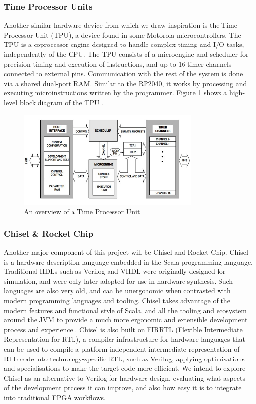 \documentclass[a4paper,fleqn,12pt]{article}
\begin{document}
\subsubsection{Time Processor Units}

Another similar hardware device from which we draw inspiration is the Time Processor Unit (TPU), a device found in some Motorola microcontrollers. The TPU is a coprocessor engine designed to handle complex timing and I/O tasks, independently of the CPU. The TPU consists of a microengine and scheduler for precision timing and execution of instructions, and up to 16 timer channels connected to external pins. Communication with the rest of the system is done via a shared dual-port RAM. Similar to the RP2040, it works by processing and executing microinstructions written by the programmer. Figure \ref{fig:tpu} shows a high-level block diagram of the TPU \citep{tpu}.

\begin{figure}[]
	\centering
	\includegraphics[width=0.8\textwidth]{../img/tpu.jpg}
	\caption{An overview of a Time Processor Unit \citep{tpu}}
	\label{fig:tpu}
\end{figure}

\subsubsection{Chisel \& Rocket Chip}

Another major component of this project will be Chisel and Rocket Chip. Chisel is a hardware description language embedded in the Scala programming language. Traditional HDLs such as Verilog and VHDL were originally designed for simulation, and were only later adopted for use in hardware synthesis. Such languages are also very old, and can be unergonomic when contrasted with modern programming languages and tooling. Chisel takes advantage of the modern features and functional style of Scala, and all the tooling and ecosystem around the JVM to provide a much more ergonomic and extensible development process and experience \citep{chisel}. Chisel is also built on FIRRTL (Flexible Intermediate Representation for RTL), a compiler infrastructure for hardware languages that can be used to compile a platform-independent intermediate representation of RTL code into technology-specific RTL, such as Verilog, applying optimisations and specialisations to make the target code more efficient\citep{firrtl}. We intend to explore Chisel as an alternative to Verilog for hardware design, evaluating what aspects of the development process it can improve, and also how easy it is to integrate into traditional FPGA workflows.
\end{document}
